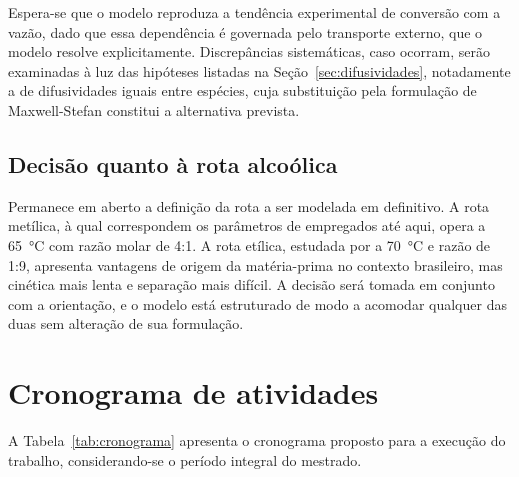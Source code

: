 Espera-se que o modelo reproduza a tendência experimental de conversão com a
vazão, dado que essa dependência é governada pelo transporte externo, que o
modelo resolve explicitamente. Discrepâncias sistemáticas, caso ocorram, serão
examinadas à luz das hipóteses listadas na Seção~\ref{sec:difusividades},
notadamente a de difusividades iguais entre espécies, cuja substituição pela
formulação de Maxwell-Stefan constitui a alternativa prevista.

\subsection{Decisão quanto à rota alcoólica}

Permanece em aberto a definição da rota a ser modelada em definitivo. A rota
metílica, à qual correspondem os parâmetros de \textcite{Melo2023} empregados
até aqui, opera a \SI{65}{\celsius} com razão molar de \num{4}:\num{1}. A rota
etílica, estudada por \textcite{Fonseca2026} a \SI{70}{\celsius} e razão de
\num{1}:\num{9}, apresenta vantagens de origem da matéria-prima no contexto
brasileiro, mas cinética mais lenta e separação mais difícil. A decisão será
tomada em conjunto com a orientação, e o modelo está estruturado de modo a
acomodar qualquer das duas sem alteração de sua formulação.

\section{Cronograma de atividades}

A Tabela~\ref{tab:cronograma} apresenta o cronograma proposto para a execução do
trabalho, considerando-se o período integral do mestrado.

